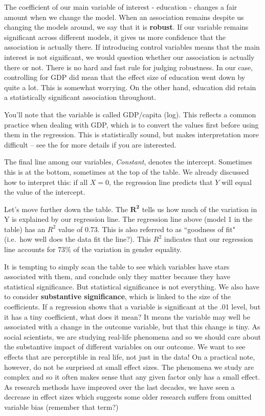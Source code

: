 \documentclass{book}
\begin{document}
The coefficient of our main variable of interest - education - changes a fair
amount when we change the model. When an association remains despite us
changing the models around, we say that it is \textbf{robust}. If our variable
remains significant across different models, it gives us more confidence that
the association is actually there. If introducing control variables means that
the main interest is not significant, we would question whether our
association is actually there or not. There is no hard and fast rule for
judging robustness. In our case, controlling for GDP did mean that the effect
size of education went down by quite a lot. This is somewhat worrying. On the
other hand, education did retain a statistically significant association
throughout.

You'll note that the variable is called GDP/capita (log). This reflects a
common practice when dealing with GDP, which is to convert the values first
before using them in the regression. This is statistically sound, but makes
interpretation more difficult -- see the for more details if you are
interested.

The final line among our variables, \emph{Constant}, denotes the intercept.
Sometimes this is at the bottom, sometimes at the top of the table. We already
discussed how to interpret this: if all \(X=0\), the regression line predicts
that \(Y\) will equal the value of the intercept.

Let's move further down the table. The \(\mathbf{R^2}\) tells us how much of
the variation in Y is explained by our regression line. The regression line
above (model 1 in the table) has an \(R^2\) value of 0.73. This is also
referred to as ``goodness of fit" (i.e.~how well does the data fit the line?).
This \(R^2\) indicates that our regression line accounts for \(73\%\) of the
variation in gender equality.

It is tempting to simply scan the table to see which variables have stars
associated with them, and conclude only they matter because they have
statistical significance. But statistical significance is not everything. We
also have to consider \textbf{substantive significance}, which is linked to
the size of the coefficients. If a regression shows that a variable is
significant at the .01 level, but it has a tiny coefficient, what does it
mean? It means the variable may well be associated with a change in the
outcome variable, but that this change is tiny. As social scientists, we are
studying real-life phenomena and so we should care about the substantive
impact of different variables on our outcome. We want to see effects that are
perceptible in real life, not just in the data! On a practical note, however,
do not be surprised at small effect sizes. The phenomena we study are complex
and so it often makes sense that any given factor only has a small effect. As
research methods have improved over the last decades, we have seen a decrease
in effect sizes which suggests some older research suffers from omitted
variable bias (remember that term?)
\end{document}
